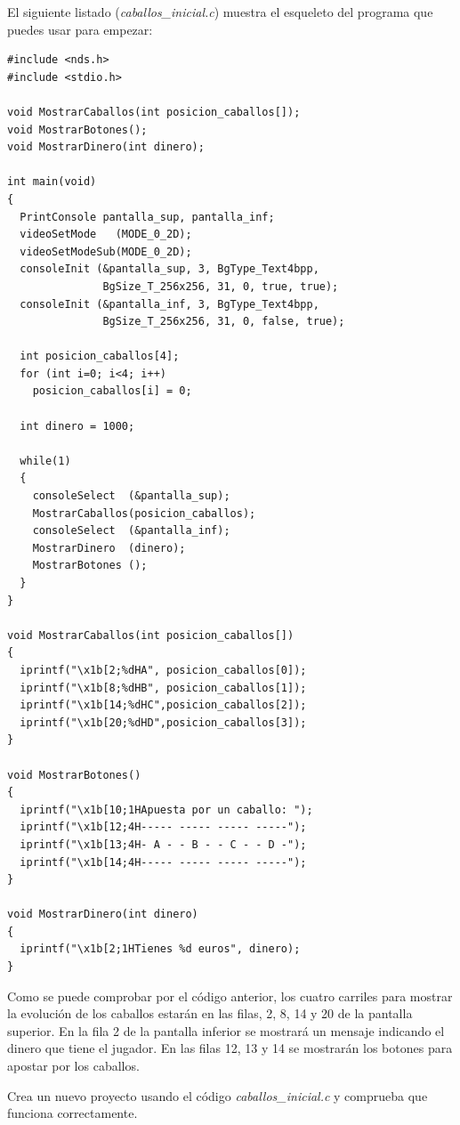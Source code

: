 \begin{example}
El siguiente listado (\textit{caballos\_inicial.c}) muestra el esqueleto del programa que puedes usar para empezar:
\begin{lstlisting}
#include <nds.h>
#include <stdio.h>

void MostrarCaballos(int posicion_caballos[]);
void MostrarBotones();
void MostrarDinero(int dinero);

int main(void)
{
  PrintConsole pantalla_sup, pantalla_inf;
  videoSetMode   (MODE_0_2D);
  videoSetModeSub(MODE_0_2D);
  consoleInit (&pantalla_sup, 3, BgType_Text4bpp, 
               BgSize_T_256x256, 31, 0, true, true);
  consoleInit (&pantalla_inf, 3, BgType_Text4bpp, 
               BgSize_T_256x256, 31, 0, false, true);

  int posicion_caballos[4];
  for (int i=0; i<4; i++)
    posicion_caballos[i] = 0;
    
  int dinero = 1000;   

  while(1)
  {
    consoleSelect  (&pantalla_sup);
    MostrarCaballos(posicion_caballos);
    consoleSelect  (&pantalla_inf);
    MostrarDinero  (dinero);
    MostrarBotones ();
  }
}

void MostrarCaballos(int posicion_caballos[])
{
  iprintf("\x1b[2;%dHA", posicion_caballos[0]);
  iprintf("\x1b[8;%dHB", posicion_caballos[1]);
  iprintf("\x1b[14;%dHC",posicion_caballos[2]);
  iprintf("\x1b[20;%dHD",posicion_caballos[3]);
}

void MostrarBotones()
{
  iprintf("\x1b[10;1HApuesta por un caballo: ");
  iprintf("\x1b[12;4H----- ----- ----- -----");
  iprintf("\x1b[13;4H- A - - B - - C - - D -");
  iprintf("\x1b[14;4H----- ----- ----- -----");
}

void MostrarDinero(int dinero)
{
  iprintf("\x1b[2;1HTienes %d euros", dinero);
}
\end{lstlisting}
\end{example}
	
Como se puede comprobar por el código anterior, los cuatro carriles para mostrar la evolución de los caballos estarán en las filas, 2, 8, 14 y 20 de la pantalla superior. En la fila 2 de la pantalla inferior se mostrará un mensaje indicando el dinero que tiene el jugador. En las filas 12, 13 y 14 se mostrarán los botones para apostar por los caballos.

\begin{exercise}
	Crea un nuevo proyecto usando el código \textit{caballos\_inicial.c} y comprueba que funciona correctamente.
\end{exercise}

